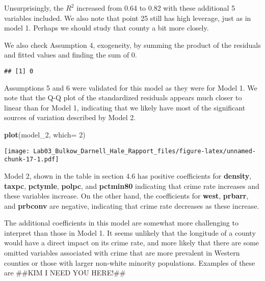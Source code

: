 \documentclass[]{article}
\newenvironment{Shaded}{\begin{snugshade}}{\end{snugshade}}
\newcommand{\KeywordTok}[1]{\textcolor[rgb]{0.13,0.29,0.53}{\textbf{#1}}}
\newcommand{\DataTypeTok}[1]{\textcolor[rgb]{0.13,0.29,0.53}{#1}}
\newcommand{\DecValTok}[1]{\textcolor[rgb]{0.00,0.00,0.81}{#1}}
\newcommand{\StringTok}[1]{\textcolor[rgb]{0.31,0.60,0.02}{#1}}
\newcommand{\OperatorTok}[1]{\textcolor[rgb]{0.81,0.36,0.00}{\textbf{#1}}}
\newcommand{\NormalTok}[1]{#1}
\begin{document}
Unsurprisingly, the \(R^2\) increased from 0.64 to 0.82 with these
additional 5 variables included. We also note that point 25 still has
high leverage, just as in model 1. Perhaps we should study that county a
bit more closely.

We also check Assumption 4, exogeneity, by summing the product of the
residuals and fitted values and finding the sum of 0.

\begin{Shaded}
\end{Shaded}

\begin{verbatim}
## [1] 0
\end{verbatim}

Assumptions 5 and 6 were validated for this model as they were for Model
1. We note that the Q-Q plot of the standardized residuals appears much
closer to linear than for Model 1, indicating that we likely have most
of the significant sources of variation described by Model 2.

\begin{Shaded}
\begin{Highlighting}[]
\KeywordTok{plot}\NormalTok{(model_}\DecValTok{2}\NormalTok{, }\DataTypeTok{which=} \DecValTok{2}\NormalTok{)}
\end{Highlighting}
\end{Shaded}

\texttt{[image: Lab03\_Bulkow\_Darnell\_Hale\_Rapport\_files/figure-latex/unnamed-chunk-17-1.pdf]}

Model 2, shown in the table in section 4.6 has positive coefficients for
\textbf{density}, \textbf{taxpc}, \textbf{pctymle}, \textbf{polpc}, and
\textbf{pctmin80} indicating that crime rate increases and these
variables increase. On the other hand, the coefficients for
\textbf{west}, \textbf{prbarr}, and \textbf{prbconv} are negative,
indicating that crime rate decreases as these increase.

The additional coefficients in this model are somewhat more challenging
to interpret than those in Model 1. It seems unlikely that the longitude
of a county would have a direct impact on its crime rate, and more
likely that there are some omitted variables associated with crime that
are more prevalent in Western counties or those with larger non-white
minority populations. Examples of these are \#\#KIM I NEED YOU HERE!\#\#
\end{document}
